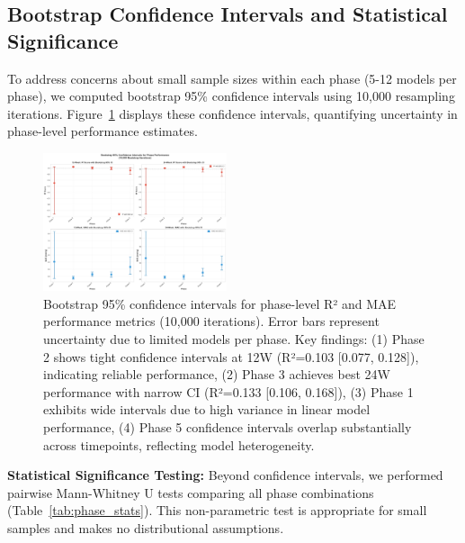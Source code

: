 \documentclass[conference]{IEEEtran}
\begin{document}
\subsection{Bootstrap Confidence Intervals and Statistical Significance}

To address concerns about small sample sizes within each phase (5-12 models per phase), we computed bootstrap 95\% confidence intervals using 10,000 resampling iterations. Figure~\ref{fig:bootstrap_ci} displays these confidence intervals, quantifying uncertainty in phase-level performance estimates.

\begin{figure}[h]
\centering
\includegraphics[width=0.48\textwidth]{figures/bootstrap_confidence_intervals.png}
\caption{Bootstrap 95\% confidence intervals for phase-level R² and MAE performance metrics (10,000 iterations). Error bars represent uncertainty due to limited models per phase. Key findings: (1) Phase 2 shows tight confidence intervals at 12W (R²=0.103 [0.077, 0.128]), indicating reliable performance, (2) Phase 3 achieves best 24W performance with narrow CI (R²=0.133 [0.106, 0.168]), (3) Phase 1 exhibits wide intervals due to high variance in linear model performance, (4) Phase 5 confidence intervals overlap substantially across timepoints, reflecting model heterogeneity.}
\label{fig:bootstrap_ci}
\end{figure}

\textbf{Statistical Significance Testing:} Beyond confidence intervals, we performed pairwise Mann-Whitney U tests comparing all phase combinations (Table~\ref{tab:phase_stats}). This non-parametric test is appropriate for small samples and makes no distributional assumptions.
\end{document}
